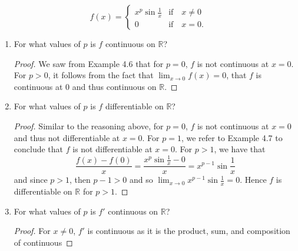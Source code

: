 \documentclass[12pt]{article}
\theoremstyle{definition}
\begin{document}
\begin{enumerate}
                \begin{equation*}
                    f(x)=\begin{cases}x^p\sin\frac{1}{x}&\text{if}\quad x\neq
                    0 \\ 0&\text{if}\quad x=0.\end{cases}
                \end{equation*}
                \begin{enumerate}[label=(\alph*)]
                    \item For what values of $p$ is $f$ continuous on $\mathbb{R}$?
                        \begin{proof}
                            We saw from Example 4.6 that for $p=0$, $f$ is not
                            continuous at $x=0$. For $p>0$, it follows from the
                            fact that $\lim_{x\to 0}f(x)=0$, that $f$ is
                            continuous at 0 and thus continuous on
                            $\mathbb{R}$.
                        \end{proof}\newpage
                    \item For what values of $p$ is $f$ differentiable on $\mathbb{R}$?
                        \begin{proof}
                            Similar to the reasoning above, for $p=0$, $f$ is
                            not continuous at $x=0$ and thus not differentiable
                            at $x=0$. For $p=1$, we refer to Example 4.7 to
                            conclude that $f$ is not differentiable at $x=0$.
                            For $p>1$, we have that 
                                \begin{equation*}
                                    \frac{f(x)-f(0)}{x}=\frac{x^p\sin\frac{1}{x}-0}{x}=x^{p-1}\sin\frac{1}{x}
                                \end{equation*}
                                and since $p>1$, then $p-1>0$ and so
                                $\lim_{x\to 0}x^{p-1}\sin\frac{1}{x}=0$. Hence
                                $f$ is differentiable on $\mathbb{R}$ for
                                $p>1$.
                        \end{proof}
                    \item For what values of $p$ is $f'$ continuous on $\mathbb{R}$?
                        \begin{proof}
                            For $x\neq 0$, $f'$ is continuous as it is the
                            product, sum, and composition of continuous

\end{proof}
\end{enumerate}
\end{enumerate}
\end{document}
